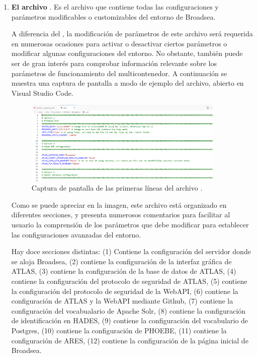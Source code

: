 \begin{enumerate}
    \item \textbf{El archivo }. Es el archivo que contiene todas las configuraciones y parámetros modificables o customizables del entorno de Broadsea.

    A diferencia del , la modificación de parámetros de este archivo será requerida en numerosas ocasiones para activar o desactivar ciertos parámetros o modificar algunas configuraciones del entorno. No obstante, también puede ser de gran interés para comprobar información relevante sobre los parámetros de funcionamiento del multicontenedor. A continuación se muestra una captura de pantalla a modo de ejemplo del archivo, abierto en Visual Studio Code.

\begin{figure}[H]
    \centering
    \includegraphics[width=0.90\textwidth]{figures/envFile.png}
    \caption{Captura de pantalla de las primeras líneas del archivo .}
    \label{fig:envFile}    
\end{figure}

    Como se puede apreciar en la imagen, este archivo está organizado en diferentes secciones, y presenta numerosos comentarios para facilitar al usuario la comprensión de los parámetros que debe modificar para establecer las configuraciones avanzadas del entorno.
    
    Hay doce secciones distintas: (1) Contiene la configuración del servidor donde se aloja Broadsea, (2) contiene la configuración de la interfaz gráfica de ATLAS, (3) contiene la configuración de la base de datos de ATLAS, (4) contiene la configuración del protocolo de seguridad de ATLAS, (5) contiene la configuración del protocolo de seguridad de la WebAPI, (6) contiene la configuración de ATLAS y la WebAPI mediante Github, (7) contiene la configuración del vocabualario de Apache Solr,  (8) contiene la configuración de identificación en HADES, (9) contiene la configuración del vocabulario de Postgres, (10) contiene la configuración de PHOEBE, (11) contiene la configuración de ARES, (12) contiene la configuración de la página inicial de Broadsea.
        
\end{enumerate}

